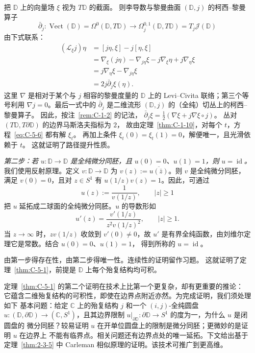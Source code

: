 把 $\mathbb D$ 上的向量场 $\xi$ 视为 $T\mathbb D$ 的截面。
则李导数与黎曼曲面 $(\mathbb D,j)$ 的柯西--黎曼算子
\[
  \bar\partial_j:\operatorname{Vect}(\mathbb D)
  =\Omega^0(\mathbb D,T\mathbb D)
  \longrightarrow\Omega^{0,1}_j(\mathbb D,T\mathbb D)
  =T_j\mathcal J(\mathbb D)
\]
由下式联系：
\begin{align*}
  (\mathcal L_\xi j)\eta
   &= [j\eta,\xi]-j[\eta,\xi]\\
   &= \nabla_\xi(j\eta)-\nabla_{j\eta}\xi
      -j\nabla_\xi\eta+j\nabla_\eta\xi\\
   &= j\nabla_\eta\xi-\nabla_{j\eta}\xi\\
   &=2j\bar\partial_j\xi(\eta).
\end{align*}
这里 $\nabla$ 是相对于某个与 $j$ 相容的黎曼度量的 $\mathbb D$ 上的
Levi--Civita 联络；第三个等号利用 $\nabla j=0$。最后一式中的
$\bar\partial_j$ 是二维流形 $(\mathbb D,j)$ 的（全纯）切丛上的柯西--黎曼算子。
因此，按注~\ref{rem:C-1-2} 的记法，
$\bar\partial_j\xi=\frac12(\nabla\xi+j\nabla\xi\circ j)$。
丛对 $(T\mathbb D,T\partial\mathbb D)$ 的边界马斯洛夫指标为 $2$，
故由定理~\ref{thm:C-1-10}，对每个 $t$，方程~\eqref{eq:C-5-6} 都有解 $\xi_t$。
再加上条件 $\xi_t(0)=\xi_t(1)=0$，解便唯一，且光滑依赖于 $t$。
这就证明了路径提升性质。

\emph{第二步：若 $u:\mathbb D\to\mathbb D$ 是全纯微分同胚，且
$u(0)=0$、$u(1)=1$，则 $u=\operatorname{id}$。}
我们使用反射原理。定义 $v:\mathbb D\to\mathbb D$ 为
$v(z):=\overline{u(\bar z)}$。则 $v$ 是全纯微分同胚，满足
$v(0)=0$，且对 $z\in S^1$ 有 $u(1/z)v(z)=1$。因此，可通过
\[
  u(z):=\frac1{v(1/z)},\qquad |z|\ge1
\]
把 $u$ 延拓成二球面的全纯微分同胚。$u$ 的导数形如
\[
  u'(z)=\frac{v'(1/z)}{z^2v(1/z)^2},\qquad |z|\ge1.
\]
当 $z\to\infty$ 时，$zv(1/z)$ 收敛到 $v'(0)\ne0$，故 $u'$
是有界全纯函数，由刘维尔定理它是常数。结合 $u(0)=0$、$u(1)=1$，
得到所称的 $u=\operatorname{id}$。

由第一步得存在性，由第二步得唯一性。连续性的证明留作习题。
这就证明了定理~\ref{thm:C-5-1}，前提是 $\mathbb D$ 上每个殆复结构均可积。

定理~\ref{thm:C-5-1} 的第二个证明在技术上比第一个更复杂，却有更重要的推论：
它蕴含二维殆复结构的可积性，即使在边界点附近亦然。为完成证明，我们须处理如下
基本问题：给定 $\mathbb C$ 上的殆复结构 $j$ 和一个 $(i,j)$-全纯圆盘
$u:(\mathbb D,\partial\mathbb D)\to(\mathbb C,S^1)$，且其边界限制
$u|_{\partial\mathbb D}:\partial\mathbb D\to S^1$ 的度为一，为什么 $u$ 是闭圆盘的
微分同胚？较易证明 $u$ 在开单位圆盘上的限制是微分同胚；更微妙的是证明 $u$ 在边界上
不能有临界点。相关问题还有边界点处的唯一延拓。下文给出基于
定理~\ref{thm:2-3-5} 中 Carleman 相似原理的证明。该技术可推广到更高维。

